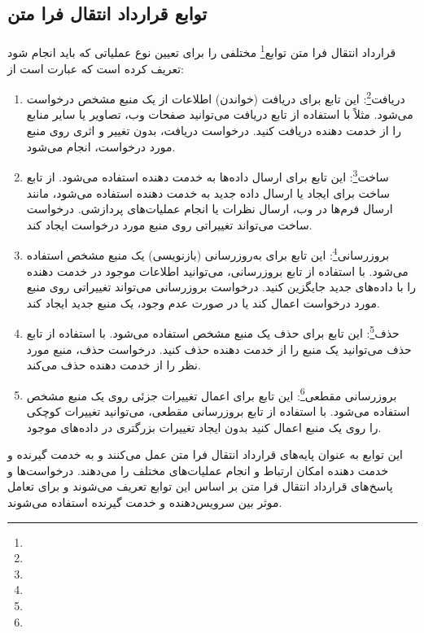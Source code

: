 \subsection{توابع قرارداد انتقال فرا متن}
\label{subsec:http_methods}
\paragraph{}
{
    قرارداد انتقال فرا متن توابع\footnote{} مختلفی را برای تعیین نوع عملیاتی که باید انجام شود تعریف کرده است که عبارت است از:
    \begin{enumerate}
        \item دریافت\footnote{}: این تابع برای دریافت (خواندن) اطلاعات از یک منبع مشخص درخواست می‌شود. مثلاً با استفاده از تابع دریافت می‌توانید صفحات وب، تصاویر یا سایر منابع را از خدمت دهنده‌ دریافت کنید. درخواست دریافت، بدون تغییر و اثری روی منبع مورد درخواست، انجام می‌شود.
        \item ساخت\footnote{}: این تابع برای ارسال داده‌ها به خدمت دهنده‌ استفاده می‌شود. از تابع ساخت برای ایجاد یا ارسال داده جدید به خدمت دهنده‌ استفاده می‌شود، مانند ارسال فرم‌ها در وب، ارسال نظرات یا انجام عملیات‌های پردازشی. درخواست ساخت می‌تواند تغییراتی روی منبع مورد درخواست ایجاد کند.
        \item بروزرسانی\footnote{}: این تابع برای به‌روزرسانی (بازنویسی) یک منبع مشخص استفاده می‌شود. با استفاده از تابع بروزرسانی، می‌توانید اطلاعات موجود در خدمت دهنده‌ را با داده‌های جدید جایگزین کنید. درخواست بروزرسانی می‌تواند تغییراتی روی منبع مورد درخواست اعمال کند یا در صورت عدم وجود، یک منبع جدید ایجاد کند.
        \item حذف\footnote{}: این تابع برای حذف یک منبع مشخص استفاده می‌شود. با استفاده از تابع حذف می‌توانید یک منبع را از خدمت دهنده‌ حذف کنید. درخواست حذف، منبع مورد نظر را از خدمت دهنده‌ حذف می‌کند.
        \item بروزرسانی مقطعی\footnote{}: این تابع برای اعمال تغییرات جزئی روی یک منبع مشخص استفاده می‌شود. با استفاده از تابع بروزرسانی مقطعی، می‌توانید تغییرات کوچکی را روی یک منبع اعمال کنید بدون ایجاد تغییرات بزرگتری در داده‌های موجود.
    \end{enumerate}
    این توابع به عنوان پایه‌های قرارداد انتقال فرا متن عمل می‌کنند و به خدمت گیرنده و خدمت دهنده‌ امکان ارتباط و انجام عملیات‌های مختلف را می‌دهند. درخواست‌ها و پاسخ‌های قرارداد انتقال فرا متن بر اساس این توابع تعریف می‌شوند و برای تعامل موثر بین سرویس‌دهنده و خدمت گیرنده استفاده می‌شوند.
}

